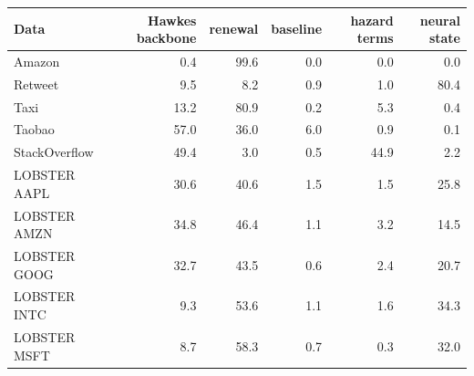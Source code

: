 \begin{tabular}{lrrrrr}
\toprule
Data & Hawkes backbone & renewal & baseline & hazard terms & neural state \\
\midrule
Amazon & 0.4 & 99.6 & 0.0 & 0.0 & 0.0 \\
Retweet & 9.5 & 8.2 & 0.9 & 1.0 & 80.4 \\
Taxi & 13.2 & 80.9 & 0.2 & 5.3 & 0.4 \\
Taobao & 57.0 & 36.0 & 6.0 & 0.9 & 0.1 \\
StackOverflow & 49.4 & 3.0 & 0.5 & 44.9 & 2.2 \\
LOBSTER AAPL & 30.6 & 40.6 & 1.5 & 1.5 & 25.8 \\
LOBSTER AMZN & 34.8 & 46.4 & 1.1 & 3.2 & 14.5 \\
LOBSTER GOOG & 32.7 & 43.5 & 0.6 & 2.4 & 20.7 \\
LOBSTER INTC & 9.3 & 53.6 & 1.1 & 1.6 & 34.3 \\
LOBSTER MSFT & 8.7 & 58.3 & 0.7 & 0.3 & 32.0 \\
\bottomrule
\end{tabular}